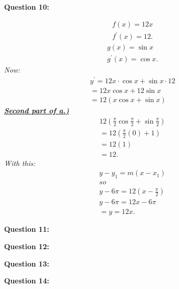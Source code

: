\documentclass{report}
\begin{document}
    \bigbreak \noindent \bigbreak \noindent 
    \begin{Large}
        \textbf{Question 10:}
    \end{Large}
    \bigbreak \noindent 
    \bigbreak \noindent
    \begin{align*}
        f(x) = 12x \\
        f^{\prime}(x) = 12
    .\end{align*}
    \begin{align*}
        g(x) = \sin{x} \\
        g^{\prime}(x) = \cos{x}
    .\end{align*}
    \bigbreak \noindent
    \textit{Now:}
    \begin{align*}
      y^{\prime} = 12x \cdot \cos{x} + \sin{x} \cdot 12 \\
      = 12x\cos{x} + 12\sin{x} \\
      = 12(x\cos{x}+\sin{x})
    \end{align*}
    \bigbreak \noindent 
    \textbf{\textit{\underline{Second part of a.)}}}
    \begin{align*}
        12(\frac{\pi}{2}\cos{\frac{\pi}{2}+\sin{\frac{\pi}{2}}}) \\
        = 12(\frac{\pi}{2}(0)+1) \\
        =12(1) \\
        =12
    .\end{align*}
    \bigbreak \noindent 
    \textit{With this:}
    \begin{align*}
        y-y_1 = m\left(x-x_1\right) \\
        so\ \\
        y - 6\pi = 12(x-\frac{\pi}{2}) \\
        y - 6\pi = 12x - 6\pi \\
        = y = 12x
    .\end{align*}

    \bigbreak \noindent \bigbreak \noindent 
    \begin{Large}
        \textbf{Question 11:}
    \end{Large}
    \bigbreak \noindent 
    \bigbreak \noindent 

    \bigbreak \noindent \bigbreak \noindent 
    \begin{Large}
        \textbf{Question 12:}
    \end{Large}
    \bigbreak \noindent 
    \bigbreak \noindent 

    \bigbreak \noindent \bigbreak \noindent 
    \begin{Large}
        \textbf{Question 13:}
    \end{Large}
    \bigbreak \noindent 
    \bigbreak \noindent 

    \bigbreak \noindent \bigbreak \noindent 
    \begin{Large}
        \textbf{Question 14:}
    \end{Large}
    \bigbreak \noindent 
    \bigbreak \noindent 
    
\end{document}
